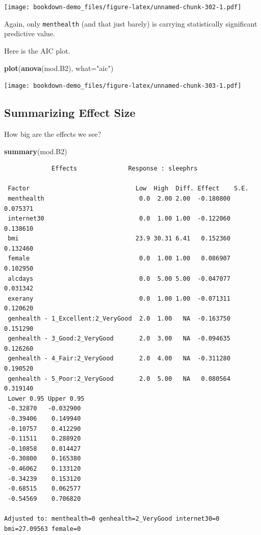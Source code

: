 \documentclass[]{book}
\newenvironment{Shaded}{\begin{snugshade}}{\end{snugshade}}
\newcommand{\KeywordTok}[1]{\textcolor[rgb]{0.13,0.29,0.53}{\textbf{#1}}}
\newcommand{\DataTypeTok}[1]{\textcolor[rgb]{0.13,0.29,0.53}{#1}}
\newcommand{\StringTok}[1]{\textcolor[rgb]{0.31,0.60,0.02}{#1}}
\newcommand{\NormalTok}[1]{#1}
\theoremstyle{definition}
\theoremstyle{definition}
\theoremstyle{definition}
\theoremstyle{remark}
\begin{document}
\texttt{[image: bookdown-demo\_files/figure-latex/unnamed-chunk-302-1.pdf]}

Again, only \texttt{menthealth} (and that just barely) is carrying
statistically significant predictive value.

Here is the AIC plot.

\begin{Shaded}
\begin{Highlighting}[]
\KeywordTok{plot}\NormalTok{(}\KeywordTok{anova}\NormalTok{(mod.B2), }\DataTypeTok{what=}\StringTok{"aic"}\NormalTok{)}
\end{Highlighting}
\end{Shaded}

\texttt{[image: bookdown-demo\_files/figure-latex/unnamed-chunk-303-1.pdf]}

\subsection{Summarizing Effect Size}\label{summarizing-effect-size-3}

How big are the effects we see?

\begin{Shaded}
\begin{Highlighting}[]
\KeywordTok{summary}\NormalTok{(mod.B2)}
\end{Highlighting}
\end{Shaded}

\begin{verbatim}
             Effects              Response : sleephrs 

 Factor                             Low  High  Diff. Effect    S.E.    
 menthealth                          0.0  2.00 2.00  -0.180800 0.075371
 internet30                          0.0  1.00 1.00  -0.122060 0.138610
 bmi                                23.9 30.31 6.41   0.152360 0.132460
 female                              0.0  1.00 1.00   0.086907 0.102950
 alcdays                             0.0  5.00 5.00  -0.047077 0.031342
 exerany                             0.0  1.00 1.00  -0.071311 0.120620
 genhealth - 1_Excellent:2_VeryGood  2.0  1.00   NA  -0.163750 0.151290
 genhealth - 3_Good:2_VeryGood       2.0  3.00   NA  -0.094635 0.126260
 genhealth - 4_Fair:2_VeryGood       2.0  4.00   NA  -0.311280 0.190520
 genhealth - 5_Poor:2_VeryGood       2.0  5.00   NA   0.080564 0.319140
 Lower 0.95 Upper 0.95
 -0.32870   -0.032900 
 -0.39406    0.149940 
 -0.10757    0.412290 
 -0.11511    0.288920 
 -0.10858    0.014427 
 -0.30800    0.165380 
 -0.46062    0.133120 
 -0.34239    0.153120 
 -0.68515    0.062577 
 -0.54569    0.706820 

Adjusted to: menthealth=0 genhealth=2_VeryGood internet30=0 bmi=27.09563 female=0  
\end{verbatim}
\end{document}
